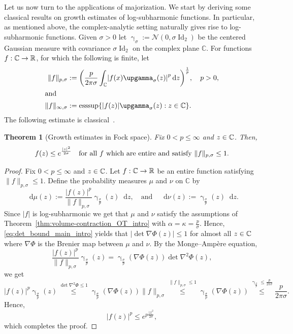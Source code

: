 \documentclass[10pt]{amsart}
\newtheorem{theo}{Theorem}[section]
\theoremstyle{definition}\newtheorem{defi}[theo]{Definition}\newtheorem{rema}[theo]{Remark}\newtheorem{exam}[theo]{Example}\newtheorem{exem}[theo]{Example}\newtheorem{nota}[theo]{Notation}
\newcommand{\R}{\mathbb R}
\newcommand{\C}{\mathbb C}
\DeclareMathOperator{\Id}{Id}
\DeclareMathOperator{\esssup}{esssup}
\newcommand{\density}{f}
\newcommand{\source}{\mu}
\newcommand{\target}{\nu}
\newcommand{\lsh}{\alpha}
\newcommand{\lc}{\kappa}
\newcommand*\diff{\mathop{}\!\mathrm{d}}
\newcommand{\clN}{\mathcal{N}}
\newcommand{\Gaussian}{\upgamma}
\newcommand{\OT}{\Phi}
\renewcommand*{\to}{\mathchoice{\longrightarrow}{\rightarrow}{\rightarrow}{\rightarrow}}
\let\originalleft\left
\let\originalright\right
\renewcommand{\left}{\mathopen{}\mathclose\bgroup\originalleft}
\renewcommand{\right}{\aftergroup\egroup\originalright}
\let\oldin\in
\renewcommand{\in}{\mathchoice{\oldin}{\oldin}{\,\oldin\,}{\,\oldin\,}}
\begin{document}
Let us now turn to the applications of majorization. We start by deriving some classical results on growth estimates of log-subharmonic functions. In particular, as mentioned above, the complex-analytic setting naturally gives rise to log-subharmonic functions. Given $\sigma>0$ let $\Gaussian_{\sigma}:=\clN(0,\sigma\Id_2)$ be the centered Gaussian measure with covariance $\sigma\Id_2$ on the complex plane $\C$. For functions $\density:\C\to\R$, for which the following is finite, let
\begin{align*}
\|f\|_{p,\sigma} &:=\left(\frac{p}{2\pi\sigma}\int_{\C}\left|f(x)\Gaussian_{\sigma}(z)\right|^p\diff z\right)^{\frac{1}{p}},\quad p>0,
\\
\intertext{and}
\|f\|_{\infty,\sigma} &:=\esssup\left\{|f(z)|\Gaussian_{\sigma}(z):z\in \C\right\}.
\end{align*}
The following estimate is classical~\cite[Theorem~2.7]{MR2934601}.
\begin{theo}[Growth estimates in Fock space]\label{thm:Fock}
Fix $0<p\le \infty$ and $z\in \C$. Then,
\begin{equation}\label{eq:Fock}
\density(z)\le e^{\frac{|z|^2}{2\sigma}}\quad\textnormal{for all $\density$ which are entire and satisfy }\|\density\|_{p,\sigma}\le 1.
\end{equation}
\end{theo}
\begin{proof}
Fix $0<p\le \infty$ and $z\in \C$. Let $f:\C\to\R$ be an entire function satisfying $\|\density\|_{p,\sigma}\le 1$. Define the probability measures $\source$ and $\target$ on $\C$ by
\begin{equation}\label{eq:source_entire}
\diff \source(z):=\frac{|\density(z)|^p}{\|\density\|_{p,\sigma}} \Gaussian_{\frac{\sigma}{p}}(z)\diff z,\quad\text{and}\quad \diff\target(z):=\Gaussian_{\frac{\sigma}{p}}(z)\diff z.
\end{equation}
Since $|\density|$ is log-subharmonic we get that $\source$ and $\target$ satisfy the assumptions of Theorem~\ref{thm:volume-contraction_OT_intro} with $\lsh=\lc=\frac{p}{\sigma}$. Hence, \eqref{eq:det_bound_main_intro} yields that $|\det \nabla\OT(z)|\le 1$ for almost all $z\in \C$ where $\nabla\OT$ is the Brenier map between $\source$ and $\target$. By the Monge--Ampère equation,
\begin{equation}\label{eq:MA_Fock}
\frac{|\density(z)|^p}{\|\density\|_{p,\sigma}} \Gaussian_{\frac{\sigma}{p}}(z)= \Gaussian_{\frac{\sigma}{p}}(\nabla\OT(z))\det\nabla^2\OT(z),
\end{equation}
we get
\[
|\density(z)|^p \Gaussian_{\frac{\sigma}{p}}(z)\overset{\det\nabla^2\OT\le 1}{\le} \Gaussian_{\frac{\sigma}{p}}(\nabla\OT(z))\|\density\|_{p, \sigma}\overset{\|\density\|_{p,\sigma}\le 1}{\le}\Gaussian_{\frac{\sigma}{p}}(\nabla\OT(z))\overset{\Gaussian_{\frac{\sigma}{p}}\le \frac{p}{2\pi\sigma}}{\le} \frac{p}{2\pi\sigma}.
\]
Hence,
\[
|\density(z)|^p\le e^{p\frac{|z|^2}{2\sigma}},
\]
which completes the proof.
\end{proof}
\end{document}
